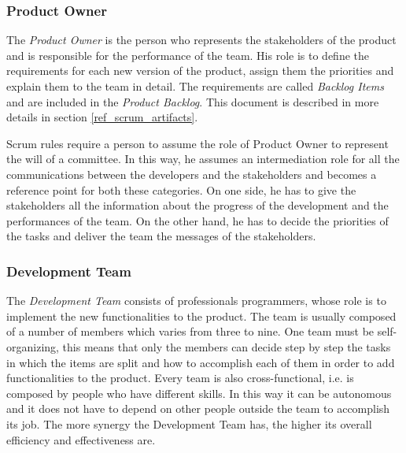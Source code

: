 			\subsubsection{Product Owner}\label{ref_prod_owner}
			The \emph{Product Owner} is the person who represents the stakeholders of the product and is responsible for the performance of the team. His role is to define the requirements for each new version of the product, assign them the priorities and explain them to the team in detail. 
			The requirements are called \emph{Backlog Items} and are included in the \emph{Product Backlog}. This document is described in more details in section \ref{ref_scrum_artifacts}.
			
			Scrum rules require a person to assume the role of Product Owner to represent the will of a committee. 
			In this way, he assumes an intermediation role for all the communications between the developers and the stakeholders and becomes a reference point for both these categories. 
			On one side, he has to give the stakeholders all the information about the progress of the development and the performances of the team. On the other hand, he has to decide the priorities of the tasks and deliver the team the messages of the stakeholders.
			

			\subsubsection{Development Team}\label{ref_scrum_dev_team}
			The \emph{Development Team} consists of professionals programmers, whose role is to implement the new functionalities to the product. The team is usually composed of a number of members which varies from three to nine. 	
			One team must be self-organizing, this means that only the members can decide step by step the tasks in which the items are split and how to accomplish each of them in order to add functionalities to the product. 
			Every team is also cross-functional, i.e. is composed by people who have different skills. In this way it can be autonomous and it does not have to depend on other people outside the team to accomplish its job.
			The more synergy the Development Team has, the higher its overall efficiency and effectiveness are.
 
